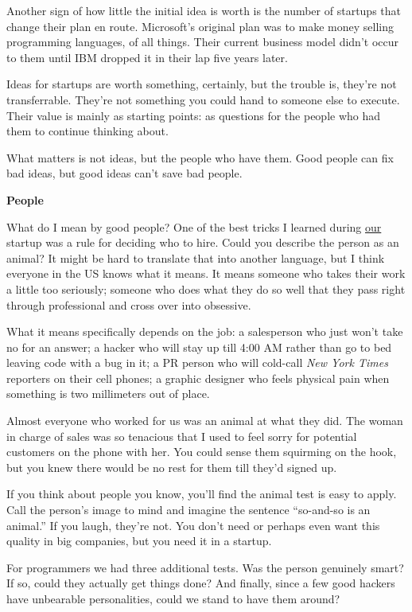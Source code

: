 \documentclass[12pt]{book}
\begin{document}
Another sign of how little the initial idea is worth is the number of
startups that change their plan en route. Microsoft's original plan was
to make money selling programming languages, of all things. Their
current business model didn't occur to them until IBM dropped it in
their lap five years later.

Ideas for startups are worth something, certainly, but the trouble is,
they're not transferrable. They're not something you could hand to
someone else to execute. Their value is mainly as starting points: as
questions for the people who had them to continue thinking about.

What matters is not ideas, but the people who have them. Good people can
fix bad ideas, but good ideas can't save bad people.

\textbf{People}

What do I mean by good people? One of the best tricks I learned during
\href{road.html}{our} startup was a rule for deciding who to hire. Could
you describe the person as an animal? It might be hard to translate that
into another language, but I think everyone in the US knows what it
means. It means someone who takes their work a little too seriously;
someone who does what they do so well that they pass right through
professional and cross over into obsessive.

What it means specifically depends on the job: a salesperson who just
won't take no for an answer; a hacker who will stay up till 4:00 AM
rather than go to bed leaving code with a bug in it; a PR person who
will cold-call \emph{New York Times} reporters on their cell phones; a
graphic designer who feels physical pain when something is two
millimeters out of place.

Almost everyone who worked for us was an animal at what they did. The
woman in charge of sales was so tenacious that I used to feel sorry for
potential customers on the phone with her. You could sense them
squirming on the hook, but you knew there would be no rest for them till
they'd signed up.

If you think about people you know, you'll find the animal test is easy
to apply. Call the person's image to mind and imagine the sentence
``so-and-so is an animal.'' If you laugh, they're not. You don't need or
perhaps even want this quality in big companies, but you need it in a
startup.

For programmers we had three additional tests. Was the person genuinely
smart? If so, could they actually get things done? And finally, since a
few good hackers have unbearable personalities, could we stand to have
them around?
\end{document}
